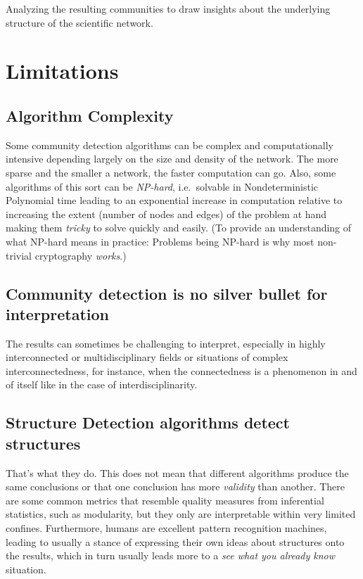 \documentclass[
  letterpaper,
]{scrreprt}
\begin{document}
Analyzing the resulting communities to draw insights about the
underlying structure of the scientific network.

\section{Limitations}\label{limitations-12}

\subsection{Algorithm Complexity}\label{algorithm-complexity}

Some community detection algorithms can be complex and computationally
intensive depending largely on the size and density of the network. The
more sparse and the smaller a network, the faster computation can go.
Also, some algorithms of this sort can be \emph{NP-hard}, i.e.~solvable
in Nondeterministic Polynomial time leading to an exponential increase
in computation relative to increasing the extent (number of nodes and
edges) of the problem at hand making them \emph{tricky} to solve quickly
and easily. (To provide an understanding of what NP-hard means in
practice: Problems being NP-hard is why most non-trivial cryptography
\emph{works}.)

\subsection{Community detection is no silver bullet for
interpretation}\label{community-detection-is-no-silver-bullet-for-interpretation}

The results can sometimes be challenging to interpret, especially in
highly interconnected or multidisciplinary fields or situations of
complex interconnectedness, for instance, when the connectedness is a
phenomenon in and of itself like in the case of interdisciplinarity.

\subsection{Structure Detection algorithms detect
structures}\label{structure-detection-algorithms-detect-structures}

That's what they do. This does not mean that different algorithms
produce the same conclusions or that one conclusion has more
\emph{validity} than another. There are some common metrics that
resemble quality measures from inferential statistics, such as
modularity, but they only are interpretable within very limited
confines. Furthermore, humans are excellent pattern recognition
machines, leading to usually a stance of expressing their own ideas
about structures onto the results, which in turn usually leads more to a
\emph{see what you already know} situation.
\end{document}
